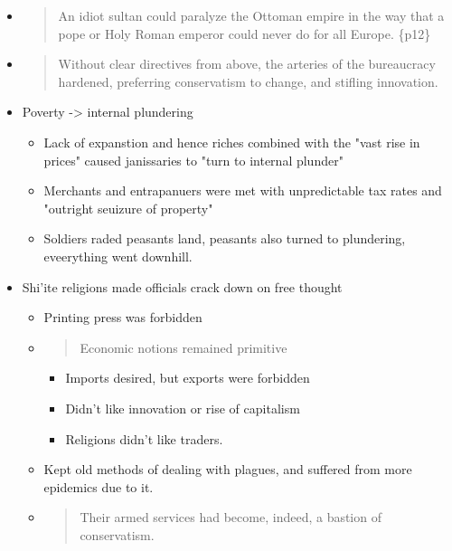 \documentclass[letterpaper]{article}
\begin{document}
\begin{itemize}
\begin{itemize}
\begin{itemize}
\item \begin{quote}
An idiot sultan could paralyze the Ottoman empire in the way
that a pope or Holy Roman emperor could never do for all Europe.
\{p12\}
\end{quote}

\item \begin{quote}
Without clear directives from above, the arteries of the
bureaucracy hardened, preferring conservatism to change, and
stifling innovation.
\end{quote}

\item Poverty -> internal plundering

\begin{itemize}
\item Lack of expanstion and hence riches combined with the "vast rise
in prices" caused janissaries to "turn to internal plunder"
\item Merchants and entrapanuers were met with unpredictable tax rates
and "outright seuizure of property"
\item Soldiers raded peasants land, peasants also turned to
plundering, eveerything went downhill.
\end{itemize}

\item Shi'ite religions made officials crack down on free thought

\begin{itemize}
\item Printing press was forbidden

\item \begin{quote}
Economic notions remained primitive
\end{quote}

\begin{itemize}
\item Imports desired, but exports were forbidden
\item Didn't like innovation or rise of capitalism
\item Religions didn't like traders.
\end{itemize}

\item Kept old methods of dealing with plagues, and suffered from more
epidemics due to it.

\item \begin{quote}
Their armed services had become, indeed, a bastion of
conservatism.
\end{quote}
\end{itemize}
\end{itemize}


\end{itemize}
\end{itemize}
\end{document}
